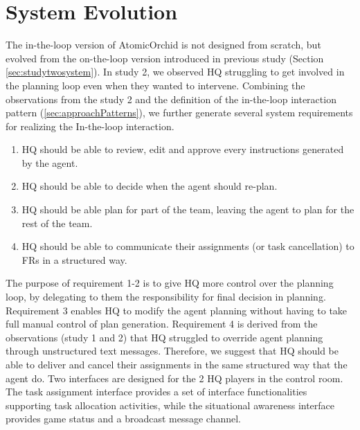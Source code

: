 \section{System Evolution}\label{sec:study3system}
The in-the-loop version of AtomicOrchid is not designed from scratch, but evolved from the on-the-loop version introduced in previous study (Section \ref{sec:studytwosystem}). In study 2, we observed HQ struggling to get involved in the planning loop even when they wanted to intervene. Combining the observations from the study 2 and the definition of the in-the-loop interaction pattern (\ref{sec:approachPatterns}), we further generate several system requirements for realizing the In-the-loop interaction. \\
\begin{enumerate}
\item HQ should be able to review, edit and approve every instructions generated by the agent.
\item HQ should be able to decide when the agent should re-plan. 
\item HQ should be able plan for part of the team, leaving the agent to plan for the rest of the team. 
\item HQ should be able to communicate their assignments (or task cancellation) to FRs in a structured way. 
\end{enumerate}

The purpose of requirement 1-2 is to give HQ more control over the planning loop, by delegating to them the responsibility for final decision in planning. Requirement 3 enables HQ to modify the agent planning without having to take full manual control of plan generation. Requirement 4 is derived from the observations (study 1 and 2) that HQ struggled to override agent planning through unstructured text messages. Therefore, we suggest that HQ should be able to deliver and cancel their assignments in the same structured way that the agent do. Two interfaces are designed for the 2 HQ players in the control room. The task assignment interface provides a set of interface functionalities supporting task allocation activities, while the situational awareness interface provides game status and a broadcast message channel.  \\

